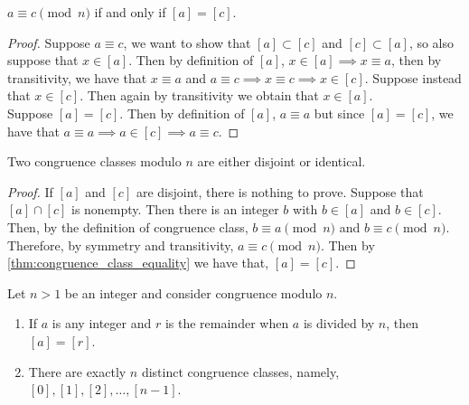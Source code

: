 \documentclass[../main.tex]{subfiles}
\begin{document}
\begin{theorem}\label{thm:congruence_class_equality}
$a \equiv c \pmod{n}$ if and only if $[a] = [c]$.

\end{theorem}

\begin{proof}
Suppose $ a \equiv c$, we want to show that $ [a] \subset [c]$ and $ [c] \subset [a]$, so also suppose that $ x \in [a]$. Then by definition of $ [a]$, $x \in [a] \implies x \equiv a$, then by transitivity, we have that $ x \equiv a$ and $ a \equiv c \implies x \equiv c \implies x \in [c].$ Suppose instead that $x \in [c]$. Then again by transitivity we obtain that $ x \in [a]$. \\
Suppose $ [a] = [c]$. Then by definition of $[a]$, $a \equiv a $ but since $ [a] = [c]$, we have that $ a \equiv a \implies a \in [c] \implies a \equiv c$.
\end{proof}







\begin{corollary}\label{cor:congruence_classes_disjoint}
Two congruence classes modulo $n$ are either disjoint or identical.
\end{corollary}

\begin{proof}
If $[a]$ and $[c]$ are disjoint, there is nothing to prove. Suppose that $[a] \cap [c]$ is nonempty. Then there is an integer $b$ with $b \in [a]$ and $b \in [c]$. Then, by the definition of congruence class, $b \equiv a \pmod{n}$ and $b \equiv c \pmod{n}$. Therefore, by symmetry and transitivity, $a \equiv c \pmod{n}$. Then by \ref{thm:congruence_class_equality} we have that, $[a] = [c]$. 
\end{proof}




\begin{exercise}
Let $n > 1$ be an integer and consider congruence modulo $n$.
\begin{enumerate}
    \item If $a$ is any integer and $r$ is the remainder when $a$ is divided by $n$, then $[a] = [r]$.
    \item There are exactly $n$ distinct congruence classes, namely, $[0], [1], [2], \dots, [n - 1]$.
\end{enumerate}
\end{exercise}
\end{document}

